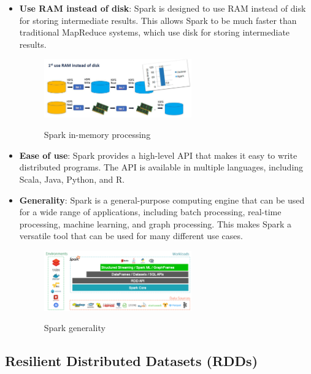 \begin{itemize}
    \item \textbf{Use RAM instead of disk}: Spark is designed to use RAM instead of disk for storing
    intermediate results. This allows Spark to be much faster than traditional MapReduce systems, which
    use disk for storing intermediate results.

    \begin{figure}[H]
        \centering
        \includegraphics[width=0.6\textwidth]{figures/use_RAM.png}
        \label{fig:spark_ram}
        \caption{Spark in-memory processing}
    \end{figure}

    \item \textbf{Ease of use}: Spark provides a high-level API that makes it easy to write distributed
    programs. The API is available in multiple languages, including Scala, Java, Python, and R.

    \item \textbf{Generality}: Spark is a general-purpose computing engine that can be used for a wide
    range of applications, including batch processing, real-time processing, machine learning, and graph
    processing. This makes Spark a versatile tool that can be used for many different use cases.

    \begin{figure}[H]
        \centering
        \includegraphics[width=0.6\textwidth]{figures/spark_generality.png}
        \label{fig:spark_generality}
        \caption{Spark generality}
    \end{figure}

\end{itemize}


\subsection{Resilient Distributed Datasets (RDDs)}

